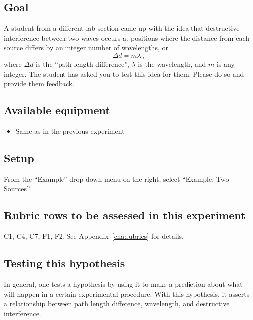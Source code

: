 \subsection{Goal}

A student from a different lab section came up with the idea that destructive interference between two waves occurs at positions where the distance from each source differs by an integer number of wavelengths, or
\begin{equation}
 \Delta d = m\lambda \,,
\end{equation}
where $\Delta d$ is the ``path length difference'', $\lambda$ is the wavelength, and $m$ is any integer. The student has asked you to test this idea for them. Please do so and provide them feedback.

\subsection{Available equipment}

\begin{itemize}
	\item Same as in the previous experiment
\end{itemize}

\subsection{Setup}

From the ``Example'' drop-down menu on the right, select ``Example: Two Sources''.

\subsection{Rubric rows to be assessed in this experiment}

C1, C4, C7, F1, F2. See Appendix~\ref{cha:rubrics} for details.

\subsection{Testing this hypothesis}

In general, one tests a hypothesis by using it to make a prediction about what will happen in a certain experimental procedure. With this hypothesis, it asserts a relationship between path length difference, wavelength, and destructive interference.

